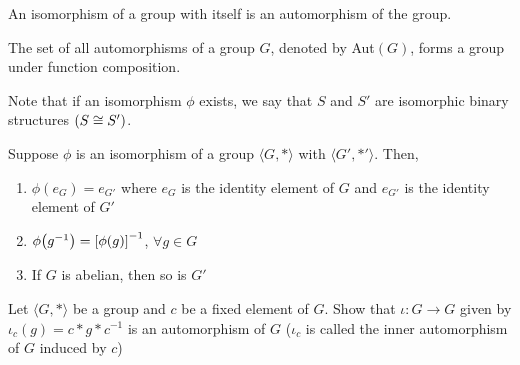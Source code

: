 \begin{definition}[Automorphism]
    An isomorphism of a group with itself is an automorphism of the group.
\end{definition}

\begin{remark}
    The set of all automorphisms of a group $G$, denoted by Aut$(G)$, forms a group under function composition.
\end{remark}

Note that if an isomorphism $\phi$ exists, we say that $S$ and $S'$ are isomorphic binary structures $\qty(S \cong S')$.

\begin{theorem}[Isomorphism]
    Suppose $\phi$ is an isomorphism of a group $\langle G, \ast \rangle$ with $\langle G', \ast' \rangle$. Then,
    \begin{enumerate}
        \item $\phi (e_G) = e_{G'}$ where $e_G$ is the identity element of $G$ and $e_{G'}$ is the identity element of $G'$
        \item $\phi \qty(g^{-1}) = \qty[\phi \qty(g)]^{-1}$, $\forall g \in G $
        \item If $G$ is abelian, then so is $G'$
    \end{enumerate}
\end{theorem}

\begin{exercise}
    Let $\langle G, \ast \rangle$ be a group and $c$ be a fixed element of $G$. Show that $\iota : G \to G$ given by $\iota_c (g) = c \ast g \ast c^{-1}$ is an automorphism of $G$ ($\iota_c$ is called the inner automorphism of $G$ induced by $c$)
\end{exercise}

